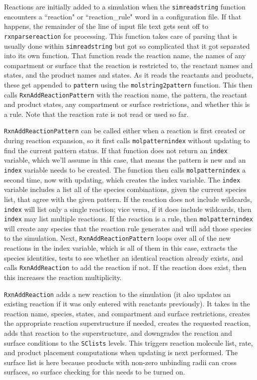 \documentclass {scrbook}
\newcommand {\ttt} {\texttt}
\begin{document}
Reactions are initially added to a simulation when the \ttt{simreadstring} function encounters a ``reaction" or ``reaction\_rule" word in a configuration file. If that happens, the remainder of the line of input file text gets sent off to \ttt{rxnparsereaction} for processing. This function takes care of parsing that is usually done within \ttt{simreadstring} but got so complicated that it got separated into its own function. That function reads the reaction name, the names of any compartment or surface that the reaction is restricted to, the reactant names and states, and the product names and states. As it reads the reactants and products, these get appended to \ttt{pattern} using the \ttt{molstring2pattern} function. This then calls \ttt{RxnAddReactionPattern} with the reaction name, the pattern, the reactant and product states, any compartment or surface restrictions, and whether this is a rule. Note that the reaction rate is not read or used so far.

\ttt{RxnAddReactionPattern} can be called either when a reaction is first created or during reaction expansion, so it first calls \ttt{molpatternindex} without updating to find the current pattern status. If that function does not return an \ttt{index} variable, which we'll assume in this case, that means the pattern is new and an \ttt{index} variable needs to be created. The function then calls \ttt{molpatternindex} a second time, now with updating, which creates the index variable. The \ttt{index} variable includes a list all of the species combinations, given the current species list, that agree with the given pattern. If the reaction does not include wildcards, \ttt{index} will list only a single reaction; vice versa, if it does include wildcards, then \ttt{index} may list multiple reactions. If the reaction is a rule, then \ttt{molpatternindex} will create any species that the reaction rule generates and will add those species to the simulation. Next, \ttt{RxnAddReactionPattern} loops over all of the new reactions in the index variable, which is all of them in this case, extracts the species identities, tests to see whether an identical reaction already exists, and calls \ttt{RxnAddReaction} to add the reaction if not. If the reaction does exist, then this increases the reaction multiplicity.

\ttt{RxnAddReaction} adds a new reaction to the simulation (it also updates an existing reaction if it was only entered with reactants previously). It takes in the reaction name, species, states, and compartment and surface restrictions, creates the appropriate reaction superstructure if needed, creates the requested reaction, adds that reaction to the superstructure, and downgrades the reaction and surface conditions to the \ttt{SClists} levels. This triggers reaction molecule list, rate, and product placement computations when updating is next performed. The surface list is here because products with non-zero unbinding radii can cross surfaces, so surface checking for this needs to be turned on.
\end{document}
